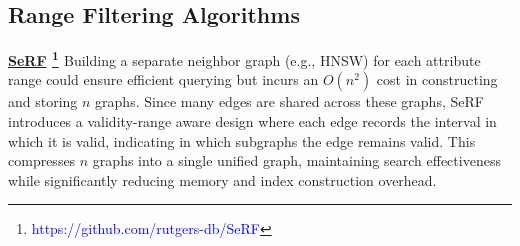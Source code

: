 \documentclass[sigconf, nonacm]{acmart}
\begin{document}
{	
	
%		
%		
%		
%			
%		
	
	\subsection{Range Filtering Algorithms}
	
	\noindent\textbf{\underline{SeRF} \footnote{\textcolor{blue}{https://github.com/rutgers-db/SeRF}} \cite{serf}} 
	Building a separate neighbor graph (e.g., HNSW) for each attribute range could ensure efficient querying but incurs an $O(n^2)$ cost in constructing and storing $n$ graphs. Since many edges are shared across these graphs, SeRF introduces a validity-range aware design where each edge records the interval in which it is valid, indicating in which subgraphs the edge remains valid. This compresses $n$ graphs into a single unified graph, maintaining search effectiveness while significantly reducing memory and index construction overhead.
	
}
\end{document}
